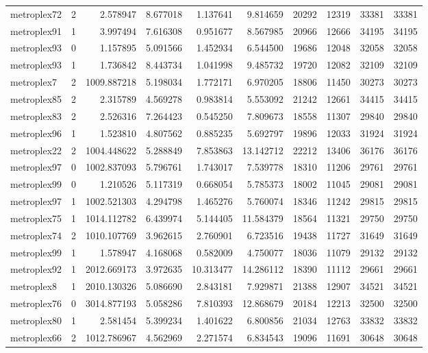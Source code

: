 \begin{longtable}{|l|r|r|r|r|r|r|r|r|r|}
metroplex72 & 2 & 2.578947 & 8.677018 & 1.137641 & 9.814659 & 20292 & 12319 & 33381 & 33381 \\
metroplex91 & 1 & 3.997494 & 7.616308 & 0.951677 & 8.567985 & 20966 & 12666 & 34195 & 34195 \\
metroplex93 & 0 & 1.157895 & 5.091566 & 1.452934 & 6.544500 & 19686 & 12048 & 32058 & 32058 \\
metroplex93 & 1 & 1.736842 & 8.443734 & 1.041998 & 9.485732 & 19720 & 12082 & 32109 & 32109 \\
metroplex7 & 2 & 1009.887218 & 5.198034 & 1.772171 & 6.970205 & 18806 & 11450 & 30273 & 30273 \\
metroplex85 & 2 & 2.315789 & 4.569278 & 0.983814 & 5.553092 & 21242 & 12661 & 34415 & 34415 \\
metroplex83 & 2 & 2.526316 & 7.264423 & 0.545250 & 7.809673 & 18558 & 11307 & 29840 & 29840 \\
metroplex96 & 1 & 1.523810 & 4.807562 & 0.885235 & 5.692797 & 19896 & 12033 & 31924 & 31924 \\
metroplex22 & 2 & 1004.448622 & 5.288849 & 7.853863 & 13.142712 & 22212 & 13406 & 36176 & 36176 \\
metroplex97 & 0 & 1002.837093 & 5.796761 & 1.743017 & 7.539778 & 18310 & 11206 & 29761 & 29761 \\
metroplex99 & 0 & 1.210526 & 5.117319 & 0.668054 & 5.785373 & 18002 & 11045 & 29081 & 29081 \\
metroplex97 & 1 & 1002.521303 & 4.294798 & 1.465276 & 5.760074 & 18346 & 11242 & 29815 & 29815 \\
metroplex75 & 1 & 1014.112782 & 6.439974 & 5.144405 & 11.584379 & 18564 & 11321 & 29750 & 29750 \\
metroplex74 & 2 & 1010.107769 & 3.962615 & 2.760901 & 6.723516 & 19438 & 11727 & 31649 & 31649 \\
metroplex99 & 1 & 1.578947 & 4.168068 & 0.582009 & 4.750077 & 18036 & 11079 & 29132 & 29132 \\
metroplex92 & 1 & 2012.669173 & 3.972635 & 10.313477 & 14.286112 & 18390 & 11112 & 29661 & 29661 \\
metroplex8 & 1 & 2010.130326 & 5.086690 & 2.843181 & 7.929871 & 21388 & 12907 & 34521 & 34521 \\
metroplex76 & 0 & 3014.877193 & 5.058286 & 7.810393 & 12.868679 & 20184 & 12213 & 32500 & 32500 \\
metroplex80 & 1 & 2.581454 & 5.399234 & 1.401622 & 6.800856 & 21034 & 12763 & 33832 & 33832 \\
metroplex66 & 2 & 1012.786967 & 4.562969 & 2.271574 & 6.834543 & 19096 & 11691 & 30648 & 30648 \\

\end{longtable}

